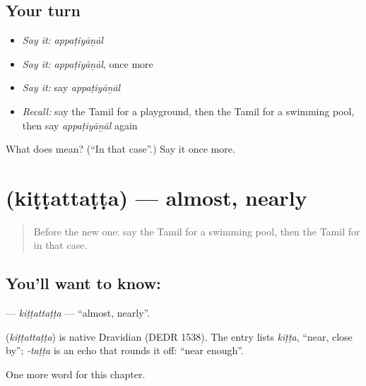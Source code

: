 \subsection*{Your turn}
\begin{itemize}
\raggedright
  \item \emph{Say it:} \emph{appaṭiyāṉāl}
  \item \emph{Say it:} \emph{appaṭiyāṉāl}, once more
  \item \emph{Say it:} say \emph{appaṭiyāṉāl}
  \item \emph{Recall:} say the Tamil for a playground, then the Tamil for a swimming pool, then say \emph{appaṭiyāṉāl} again
\end{itemize}

\begin{tcolorbox}[breakable,colback=teal!4,colframe=teal!35!black,title={Before you move on}]
What does  mean? (\textquotedblleft{}In that case\textquotedblright{}.) Say it once more.
\end{tcolorbox}
\section[\texorpdfstring{\ta{கிட்டத்தட்ட} (kiṭṭattaṭṭa)}{கிட்டத்தட்ட (kiṭṭattaṭṭa)}]{ (kiṭṭattaṭṭa) — almost, nearly}

\label{lesson:TA-C207-kittattatta}



\begin{quote}
Before the new one: say the Tamil for a swimming pool, then the Tamil for in that case.
\end{quote}

\subsection*{You'll want to know: }
\textbf{} — \emph{kiṭṭattaṭṭa} — \textquotedblleft{}almost, nearly\textquotedblright{}.

\begin{cousinweb}
\textbf{} (\emph{kiṭṭattaṭṭa}) is native Dravidian (DEDR 1538). The entry lists \emph{kiṭṭa}, \textquotedblleft{}near, close by\textquotedblright{}; \emph{-taṭṭa} is an echo that rounds it off: \textquotedblleft{}near enough\textquotedblright{}.
\end{cousinweb}

\begin{grammarlens}[title={What you've built}]
One more word for this chapter.
\end{grammarlens}

